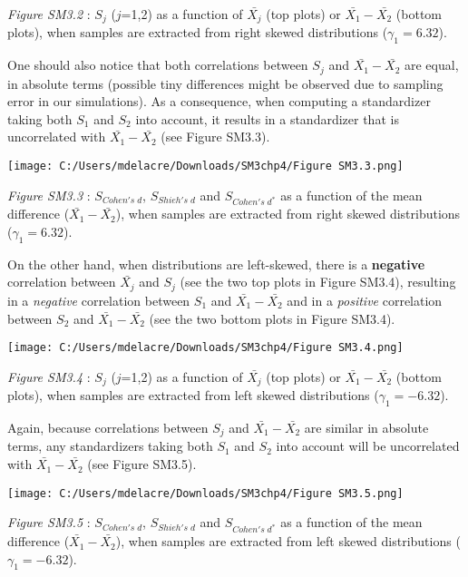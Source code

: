 \documentclass[
  english,
  man,mask,floatsintext]{apa6}
\begin{document}
\setlength\parindent{0pt}\emph{Figure SM3.2} : \(S_j\) (\(j\)=1,2) as a function of \(\bar{X_j}\) (top plots) or \(\bar{X_1}-\bar{X_2}\) (bottom plots), when samples are extracted from right skewed distributions (\(\gamma_1 = 6.32\)).

\setlength\parindent{24pt}One should also notice that both correlations between \(S_j\) and \(\bar{X_1}-\bar{X_2}\) are equal, in absolute terms (possible tiny differences might be observed due to sampling error in our simulations). As a consequence, when computing a standardizer taking both \(S_1\) and \(S_2\) into account, it results in a standardizer that is uncorrelated with \(\bar{X_1}-\bar{X_2}\) (see Figure SM3.3).

\newpage

\texttt{[image: C:/Users/mdelacre/Downloads/SM3chp4/Figure SM3.3.png]}

\setlength\parindent{0pt}\emph{Figure SM3.3} : \(S_{Cohen's \; d}\), \(S_{Shieh's \; d}\) and \(S_{Cohen's \; d^*}\) as a function of the mean difference (\(\bar{X_1}-\bar{X_2}\)), when samples are extracted from right skewed distributions (\(\gamma_1 = 6.32\)).

\setlength\parindent{24pt}On the other hand, when distributions are left-skewed, there is a \textbf{negative} correlation between \(\bar{X_j}\) and \(S_j\) (see the two top plots in Figure SM3.4), resulting in a \emph{negative} correlation between \(S_1\) and \(\bar{X_1}-\bar{X_2}\) and in a \emph{positive} correlation between \(S_2\) and \(\bar{X_1}-\bar{X_2}\) (see the two bottom plots in Figure SM3.4).

\texttt{[image: C:/Users/mdelacre/Downloads/SM3chp4/Figure SM3.4.png]}

\setlength\parindent{0pt}\emph{Figure SM3.4} : \(S_j\) (\(j\)=1,2) as a function of \(\bar{X_j}\) (top plots) or \(\bar{X_1}-\bar{X_2}\) (bottom plots), when samples are extracted from left skewed distributions (\(\gamma_1 = -6.32\)).

\setlength\parindent{24pt}Again, because correlations between \(S_j\) and \(\bar{X_1}-\bar{X_2}\) are similar in absolute terms, any standardizers taking both \(S_1\) and \(S_2\) into account will be uncorrelated with \(\bar{X_1}-\bar{X_2}\) (see Figure SM3.5).

\texttt{[image: C:/Users/mdelacre/Downloads/SM3chp4/Figure SM3.5.png]}

\setlength\parindent{0pt}\emph{Figure SM3.5} : \(S_{Cohen's \; d}\), \(S_{Shieh's \; d}\) and \(S_{Cohen's \; d^*}\) as a function of the mean difference (\(\bar{X_1}-\bar{X_2}\)), when samples are extracted from left skewed distributions (\(\gamma_1 = -6.32\)).
\end{document}
